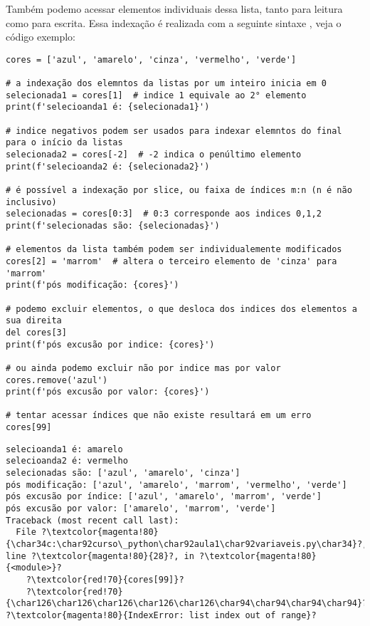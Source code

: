 Também podemo acessar elementos individuais dessa lista, tanto para leitura como para escrita.
Essa indexação é realizada com a seguinte sintaxe , veja o código exemplo:
\begin{verbatim}
cores = ['azul', 'amarelo', 'cinza', 'vermelho', 'verde']

# a indexação dos elemntos da listas por um inteiro inicia em 0
selecionada1 = cores[1]  # indice 1 equivale ao 2° elemento
print(f'selecioanda1 é: {selecionada1}')

# indice negativos podem ser usados para indexar elemntos do final para o início da listas
selecionada2 = cores[-2]  # -2 indica o penúltimo elemento
print(f'selecioanda2 é: {selecionada2}')

# é possível a indexação por slice, ou faixa de índices m:n (n é não inclusivo)
selecionadas = cores[0:3]  # 0:3 corresponde aos indices 0,1,2
print(f'selecionadas são: {selecionadas}')

# elementos da lista também podem ser individualemente modificados
cores[2] = 'marrom'  # altera o terceiro elemento de 'cinza' para 'marrom'
print(f'pós modificação: {cores}')

# podemo excluir elementos, o que desloca dos indices dos elementos a sua direita
del cores[3]
print(f'pós excusão por indice: {cores}')

# ou ainda podemo excluir não por indice mas por valor
cores.remove('azul')
print(f'pós excusão por valor: {cores}')

# tentar acessar índices que não existe resultará em um erro
cores[99]
\end{verbatim}
\begin{verbatim}
selecioanda1 é: amarelo
selecioanda2 é: vermelho
selecionadas são: ['azul', 'amarelo', 'cinza']
pós modificação: ['azul', 'amarelo', 'marrom', 'vermelho', 'verde']
pós excusão por índice: ['azul', 'amarelo', 'marrom', 'verde']
pós excusão por valor: ['amarelo', 'marrom', 'verde']
Traceback (most recent call last):
  File ?\textcolor{magenta!80}{\char34c:\char92curso\_python\char92aula1\char92variaveis.py\char34}?, line ?\textcolor{magenta!80}{28}?, in ?\textcolor{magenta!80}{<module>}?
    ?\textcolor{red!70}{cores[99]}?
    ?\textcolor{red!70}{\char126\char126\char126\char126\char126\char94\char94\char94\char94}?
?\textcolor{magenta!80}{IndexError: list index out of range}?
\end{verbatim}

